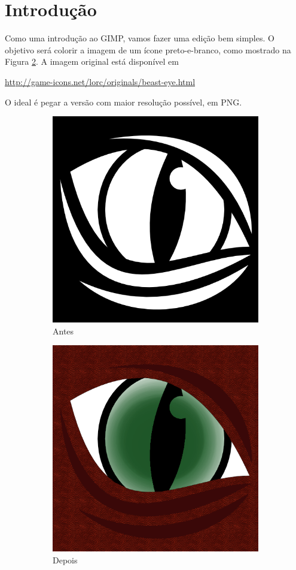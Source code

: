 \documentclass[12pt,onecolumn]{article}
\begin{document}
\clearpage
\section{Introdução}
  Como uma introdução ao GIMP, vamos fazer uma edição bem simples. O objetivo
  será colorir a imagem de um ícone preto-e-branco, como mostrado na Figura
  \ref{fig:intro}. A imagem original está disponível em
  
  \begin{center}
    \url{http://game-icons.net/lorc/originals/beast-eye.html}      
  \end{center}
  
   O ideal é pegar a versão com maior resolução possível, em PNG.

  \begin{figure}
    \centering
    \begin{subfigure}{.5\textwidth}
      \centering
      \includegraphics[width=.7\linewidth]{beast-eye.png}
      \caption{Antes}
      \label{fig:ex1_before}
    \end{subfigure}%
    \begin{subfigure}{.5\textwidth}
      \centering
      \includegraphics[width=.7\linewidth]{draft00.png}
      \caption{Depois}
    \end{subfigure}
    \caption{}
    \label{fig:intro}
  \end{figure}
  
\end{document}
